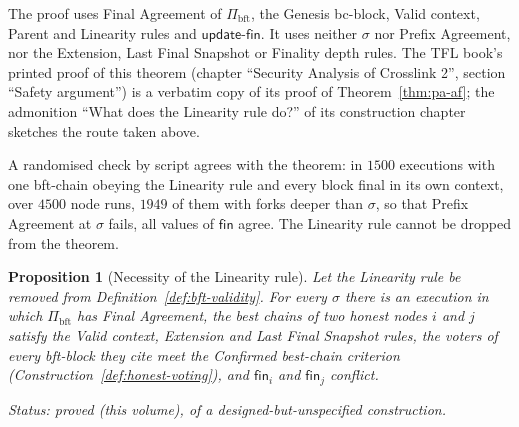 \documentclass[11pt,a4paper]{article}
\newtheorem{proposition}[theorem]{Proposition}
\theoremstyle{definition}
\newcommand{\bft}{\mathrm{bft}}
\newcommand{\Pibft}{\Pi_{\bft}}
\newcommand{\fin}{\mathsf{fin}}
\newcommand{\updatefin}{\mathsf{update\text{-}fin}}
\begin{document}
The proof uses Final Agreement of $\Pibft$, the Genesis bc-block, Valid
context, Parent and Linearity rules and $\updatefin$. It uses neither $\sigma$
nor Prefix Agreement, nor the Extension, Last Final Snapshot or Finality depth
rules.
The TFL book's printed proof of this theorem (chapter ``Security Analysis of
Crosslink 2'', section ``Safety argument'') is a verbatim copy of its proof
of Theorem~\ref{thm:pa-af}; the admonition ``What does the Linearity rule
do?'' of its construction chapter sketches the route taken above.

A randomised check by script agrees with the theorem: in $1500$ executions
with one bft-chain obeying the Linearity rule and every block final in its
own context, over $4500$ node runs, $1949$ of them with forks deeper than
$\sigma$, so that Prefix Agreement at $\sigma$ fails, all values of $\fin$
agree. The Linearity rule cannot be dropped from the theorem.

\begin{proposition}[Necessity of the Linearity rule]\label{prop:fa-needs-lin}
Let the Linearity rule be removed from Definition~\ref{def:bft-validity}.
For every $\sigma$ there is an execution in which $\Pibft$ has Final
Agreement, the best chains of two honest nodes $i$ and $j$ satisfy the Valid
context, Extension and Last Final Snapshot rules, the voters of every
bft-block they cite meet the Confirmed best-chain criterion
(Construction~\ref{def:honest-voting}), and $\fin_i$ and $\fin_j$ conflict.

Status: proved (this volume), of a designed-but-unspecified construction.
\end{proposition}
\end{document}

